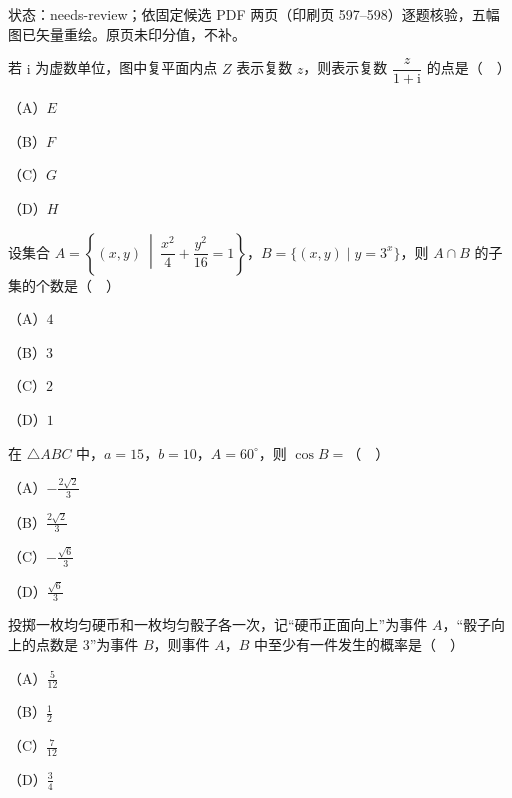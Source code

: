 

状态：needs-review；依固定候选 PDF 两页（印刷页 597–598）逐题核验，五幅图已矢量重绘。原页未印分值，不补。


\Needspace{0.4\textheight}
\begingroup
\renewenvironment{question}{\Needspace{0.5\textheight}}{}
\begin{question}
若 $\mathrm i$ 为虚数单位，图中复平面内点 $Z$ 表示复数 $z$，则表示复数 $\dfrac{z}{1+\mathrm i}$ 的点是（　）

（A）$E$

（B）$F$

（C）$G$

（D）$H$
\nopagebreak[4]
\begin{center}\end{center}
\nopagebreak[4]
\end{question}
\endgroup
\begin{question}
设集合 $A=\left\{(x,y)\ \middle|\ \dfrac{x^2}{4}+\dfrac{y^2}{16}=1\right\}$，$B=\{(x,y)\mid y=3^x\}$，则 $A\cap B$ 的子集的个数是（　）

（A）$4$

（B）$3$

（C）$2$

（D）$1$

\end{question}
\begin{question}
在 $\triangle ABC$ 中，$a=15$，$b=10$，$A=60^\circ$，则 $\cos B=$（　）

（A）$-\frac{2\sqrt2}{3}$

（B）$\frac{2\sqrt2}{3}$

（C）$-\frac{\sqrt6}{3}$

（D）$\frac{\sqrt6}{3}$

\end{question}
\begin{question}
投掷一枚均匀硬币和一枚均匀骰子各一次，记“硬币正面向上”为事件 $A$，“骰子向上的点数是 $3$”为事件 $B$，则事件 $A$，$B$ 中至少有一件发生的概率是（　）

（A）$\frac{5}{12}$

（B）$\frac12$

（C）$\frac{7}{12}$

（D）$\frac34$

\end{question}
